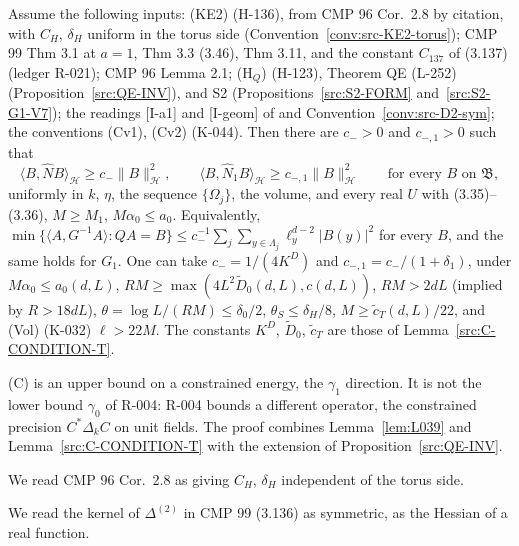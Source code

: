 \begin{proposition}\label{prop:L038}
Assume the following inputs:
(KE2) (H-136), from CMP 96 Cor.~2.8 by citation, with $C_H$, $\delta_H$ uniform in the torus side (Convention~\ref{conv:src-KE2-torus});
CMP 99 Thm 3.1 at $a=1$, Thm 3.3 (3.46), Thm 3.11, and the constant $C_{137}$ of (3.137) (ledger R-021);
CMP 96 Lemma 2.1;
(H$_Q$) (H-123), Theorem QE (L-252) (Proposition~\ref{src:QE-INV}), and S2 (Propositions~\ref{src:S2-FORM} and~\ref{src:S2-G1-V7});
the readings [I-a1] and [I-geom] of  and Convention~\ref{conv:src-D2-sym};
the conventions (Cv1), (Cv2) (K-044).
Then there are $c_->0$ and $c_{-,1}>0$ such that
\[
\langle B,\hat NB\rangle_{\mathcal H}\ge c_-\|B\|_{\mathcal H}^2,\qquad\langle B,\hat N_1B\rangle_{\mathcal H}\ge c_{-,1}\|B\|_{\mathcal H}^2\qquad\text{for every }B\text{ on }\mathfrak B,
\]
uniformly in $k$, $\eta$, the sequence $\{\Omega_j\}$, the volume, and every real $U$ with (3.35)--(3.36), $M\ge M_1$, $M\alpha_0\le a_0$. Equivalently, $\min\{\langle A,G^{-1}A\rangle:QA=B\}\le c_-^{-1}\sum_j\sum_{y\in\Lambda_j}\ell_y^{d-2}|B(y)|^2$ for every $B$, and the same holds for $G_1$. One can take $c_-=1/(4K^D)$ and $c_{-,1}=c_-/(1+\delta_1)$, under $M\alpha_0\le a_0(d,L)$, $RM\ge\max(4L^2\tilde D_0(d,L),c(d,L))$, $RM>2dL$ (implied by $R>18dL$), $\theta=\log L/(RM)\le\delta_0/2$, $\theta_S\le\delta_H/8$, $M\ge\tilde c_T(d,L)/22$, and (Vol) (K-032) $\ell>22M$. The constants $K^D$, $\tilde D_0$, $\tilde c_T$ are those of Lemma~\ref{src:C-CONDITION-T}.
\end{proposition}
(C) is an upper bound on a constrained energy, the $\gamma_1$ direction. It is not the lower bound $\gamma_0$ of R-004: R-004 bounds a different operator, the constrained precision $C^*\Delta_kC$ on unit fields. The proof combines Lemma~\ref{lem:L039} and Lemma~\ref{src:C-CONDITION-T} with the extension of Proposition~\ref{src:QE-INV}.

\begin{convention}\label{conv:src-KE2-torus}
We read CMP 96 Cor.~2.8 as giving $C_H$, $\delta_H$ independent of the torus side.
\end{convention}

\begin{convention}\label{conv:src-D2-sym}
We read the kernel of $\Delta^{(2)}$ in CMP 99 (3.136) as symmetric, as the Hessian of a real function.
\end{convention}

